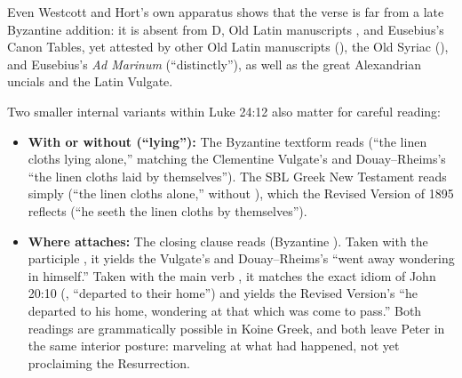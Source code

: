 Even Westcott and Hort's own apparatus shows that the verse is far from a late Byzantine addition: it is absent from D, Old Latin manuscripts , and Eusebius's Canon Tables, yet attested by other Old Latin manuscripts (), the Old Syriac (), and Eusebius's \emph{Ad Marinum} (``distinctly''), as well as the great Alexandrian uncials and the Latin Vulgate.

Two smaller internal variants within Luke 24:12 also matter for careful reading:

\begin{itemize}
\item \textbf{With or without  (``lying''):} The Byzantine textform reads  (``the linen cloths lying alone,'' matching the Clementine Vulgate's  and Douay--Rheims's ``the linen cloths laid by themselves''). The SBL Greek New Testament reads simply  (``the linen cloths alone,'' without ), which the Revised Version of 1895 reflects (``he seeth the linen cloths by themselves'').
\item \textbf{Where  attaches:} The closing clause reads  (Byzantine ). Taken with the participle , it yields the Vulgate's  and Douay--Rheims's ``went away wondering in himself.'' Taken with the main verb , it matches the exact idiom of John 20:10 (, ``departed to their home'') and yields the Revised Version's ``he departed to his home, wondering at that which was come to pass.'' Both readings are grammatically possible in Koine Greek, and both leave Peter in the same interior posture: marveling at what had happened, not yet proclaiming the Resurrection.
\end{itemize}

